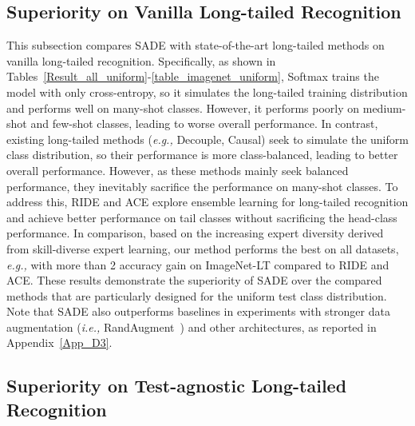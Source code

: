 \documentclass{article}
\def\eg{\emph{e.g.}} \def\Eg{\emph{E.g.}}
\def\ie{\emph{i.e.}} \def\Ie{\emph{I.e.}}
\def\ie{\emph{i.e., }}
\def\eg{\emph{e.g., }}
\begin{document}
\subsection{Superiority on Vanilla Long-tailed Recognition}
This subsection compares   SADE with state-of-the-art long-tailed   methods   on vanilla long-tailed recognition. Specifically, as shown in Tables~\ref{Result_all_uniform}-\ref{table_imagenet_uniform},   Softmax   trains the model with only cross-entropy, so it simulates the long-tailed training   distribution and performs   well on many-shot classes. However, it performs poorly on medium-shot  and few-shot classes, leading to   worse overall performance. In contrast, existing long-tailed  methods (\eg Decouple, Causal) seek to simulate the  uniform   class distribution, so their performance  is more class-balanced, leading to better overall performance. However,  as these methods mainly seek    balanced performance, they inevitably sacrifice the performance on   many-shot classes. To address this, RIDE and ACE explore ensemble learning for long-tailed recognition and achieve  better performance on tail classes without sacrificing the head-class performance. In comparison, based on the increasing expert diversity derived from   skill-diverse expert learning, our method performs  the best on all datasets, \eg  with more than 2 
accuracy gain on  ImageNet-LT    compared to RIDE and ACE. These results  demonstrate  the superiority  of SADE over the compared methods that are particularly designed  for the uniform test  class distribution. Note that SADE also outperforms baselines  in experiments with stronger data augmentation (\ie RandAugment~\cite{cubuk2020randaugment}) and other architectures, as reported in Appendix~\ref{App_D3}. 
  
   
 
 \newpage 
\subsection{Superiority on Test-agnostic Long-tailed Recognition}\label{sec_5.5}
 
\end{document}
